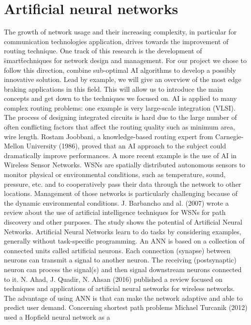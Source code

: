 \section{Artificial neural networks}
\bigbreak
The growth of network usage and their increasing complexity, in particular for communication 
technologies application, drives towards the improvement of routing technique. One track of this 
research is the development of \"smart\" techniques for network design and management.
\bigbreak
For our project we chose to follow this direction, combine sub-optimal AI algorithms to develop a 
possibly innovative solution. Lead by example, we will give an overview of the most edge braking 
applications in this field. This will allow us to introduce the main concepts and get down to the 
techniques we focused on.
\bigbreak
AI is applied to many complex routing problems: one example is very large-scale integration (VLSI). 
The process of designing integrated circuits is hard due to the large number of often conflicting 
factors that affect the routing quality such as minimum area, wire length. Rostam Joobbani, a 
knowledge-based routing expert from Carnegie-Mellon University (1986), proved that an AI approach 
to the subject could dramatically improve performances. 
\bigbreak
A more recent example is the use of AI in Wireless Sensor Networks. WSNs are spatially distributed 
autonomous sensors to monitor physical or environmental conditions, such as temperature, sound, 
pressure, etc. and to cooperatively pass their data through the network to other locations. Management
 of those networks is particularly challenging because of the dynamic environmental conditions. 
J. Barbancho and al. (2007) wrote a review about the use of artificial intelligence techniques for 
WSNs for path discovery and other purposes. The study shows the potential of Artificial Neural Networks. 
\bigbreak
Artificial Neural Networks learn to do tasks by considering examples, generally without task-specific 
programming. An ANN is based on a collection of connected units called artificial neurons. Each 
connection (synapse) between neurons can transmit a signal to another neuron. The receiving 
(postsynaptic) neuron can process the signal(s) and then signal downstream neurons connected to it.
\bigbreak
N. Ahad, J.  Quadir, N. Ahsan (2016) published a review focused on techniques and applications of 
artificial neural networks for wireless networks. The advantage of using ANN is that can make the 
network adaptive and able to predict user demand.
\bigbreak
Concerning shortest path problems Michael Turcanik (2012) used a Hopfield neural network as a 
